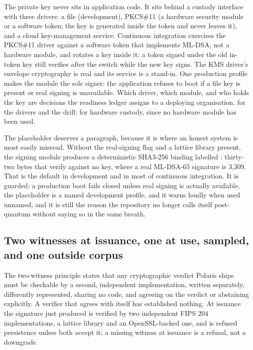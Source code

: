 The private key never sits in application code. It sits behind a custody interface with three
drivers: a file (development), PKCS\#11 (a hardware security module or a software token; the key is
generated inside the token and never leaves it), and a cloud key-management service. Continuous
integration exercises the PKCS\#11 driver against a software token that implements ML-DSA, not a
hardware module, and rotates a key inside it: a token signed under the old in-token key still
verifies after the switch while the new key signs. The KMS driver's envelope cryptography is real
and its service is a stand-in. One production profile makes the module the sole signer: the
application refuses to boot if a file key is present or real signing is unavailable. Which driver,
which module, and who holds the key are decisions the readiness ledger assigns to a deploying
organisation. \sImplMark{} for the drivers and the drill; \sExt{} for hardware custody, since no hardware
module has been used.

The placeholder deserves a paragraph, because it is where an honest system is most easily
misread. Without the real-signing flag and a
lattice library present, the signing module produces a deterministic SHA3-256 binding labelled
: thirty-two bytes that verify against no key, where a real
ML-DSA-65 signature is 3,309. That is the default in development and in most of continuous
integration. It is guarded: a production boot fails closed unless real signing is
actually available, the placeholder is a named development profile, and it warns loudly when used
unnamed, and it is still the reason the repository no longer calls itself post-quantum without
saying so in the same breath. \sImpl

\subsection{Two witnesses at issuance, one at use, sampled, and one outside corpus}

The two-witness principle states that any cryptographic verdict Polaris ships must be checkable by
a second, independent implementation, written separately, differently represented, sharing no code,
and agreeing on the verdict or abstaining explicitly. A verifier that agrees with itself has
established nothing. At issuance the signature just produced is verified by two independent FIPS 204
implementations, a lattice library and an OpenSSL-backed one, and is refused persistence unless both
accept it; a missing witness at issuance is a refusal, not a downgrade. \sImpl

